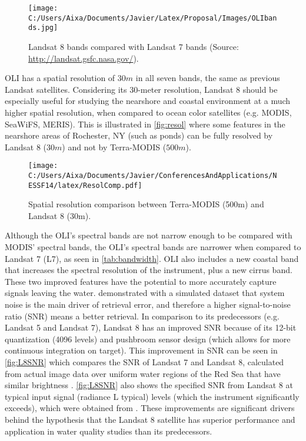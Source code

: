 \begin{figure}[htb]
\centering
      \texttt{[image: C:/Users/Aixa/Documents/Javier/Latex/Proposal/Images/OLIbands.jpg]}
      \caption{Landsat 8 bands compared with Landsat 7 bands (Source: \protect\url{http://landsat.gsfc.nasa.gov/}).}
      \label{fig:olibands}
\end{figure}

OLI has a spatial resolution of $30m$ in all seven bands, the same as previous Landsat satellites. Considering its 30-meter resolution, Landsat 8 should be especially useful for studying the nearshore and coastal environment at a much higher spatial resolution, when compared to ocean color satellites (e.g. MODIS, SeaWiFS, MERIS). This is illustrated in \autoref{fig:resol} where some features in the nearshore areas of Rochester, NY (such as ponds) can be fully resolved by Landsat 8 ($30m$) and not by Terra-MODIS ($500m$).

\begin{figure}[htb]
  \centering
  \texttt{[image: C:/Users/Aixa/Documents/Javier/ConferencesAndApplications/NESSF14/latex/ResolComp.pdf]}
  \caption{Spatial resolution comparison between Terra-MODIS (500m) and Landsat 8 (30m). \label{fig:resol} } 
\end{figure}

Although the OLI's spectral bands are not narrow enough to be compared with MODIS' spectral bands, the OLI's spectral bands are narrower when compared to Landsat 7 (L7), as seen in \autoref{tab:bandwidth}. OLI also includes a new coastal band that increases the spectral resolution of the instrument, plus a new cirrus band. These two improved features have the potential to more accurately capture signals leaving the water. \cite{Gerace:2013} demonstrated with a simulated dataset that system noise is the main driver of retrieval error, and therefore a higher signal-to-noise ratio (SNR) means a better retrieval. In comparison to its predecessors (e.g. Landsat 5 and Landsat 7), Landsat 8 has an improved SNR because of its 12-bit quantization (4096 levels) and pushbroom sensor design (which allows for more continuous integration on target). This improvement in SNR can be seen in \autoref{fig:L8SNR} which compares the SNR of Landsat 7 and Landsat 8, calculated from actual image data over uniform water regions of the Red Sea that have similar brightness \cite{Hu:2012}. \autoref{fig:L8SNR} also shows the specified SNR from Landsat 8 at typical input signal (radiance L typical) levels (which the instrument significantly exceeds), which were obtained from \cite{Irons:2012}. These improvements are significant drivers behind the hypothesis that the Landsat 8 satellite has superior performance and application in water quality studies than its predecessors.


